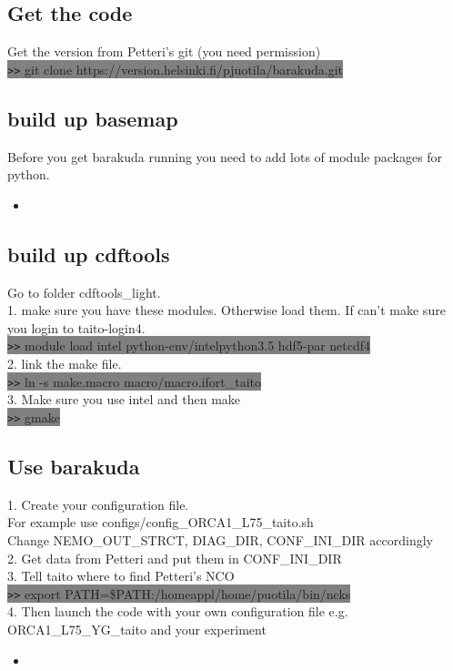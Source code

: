 \documentclass[11pt]{article}
\newcommand{\insertcode}[2]{\begin{itemize}\item[]\end{itemize}} %
\begin{document}
\subsection{Get the code}
Get the version from Petteri's git (you need permission)\\
\colorbox{Grey}{\texttt{>>} git clone https://version.helsinki.fi/pjuotila/barakuda.git}\\
\subsection{build up basemap}
Before you get barakuda running you need to add lots of module packages for python.\\
\insertcode{"../barakuda_script/basemap_install.sh"}{} 
\subsection{build up cdftools}
Go to folder cdftools\_light. \\
1. make sure you have these modules. Otherwise load them. If can't make sure you login to taito-login4.\\
 \colorbox{Grey}{\texttt{>>} module load intel python-env/intelpython3.5 hdf5-par netcdf4}\\
2. link the make file.\\
 \colorbox{Grey}{\texttt{>>} ln -s  make.macro  macro/macro.ifort\_taito}\\
3. Make sure you use intel and then make \\
 \colorbox{Grey}{\texttt{>>} gmake}\\
\subsection{Use barakuda}
1. Create your configuration file.\\
 For example use configs/config\_ORCA1\_L75\_taito.sh \\
 Change NEMO\_OUT\_STRCT, DIAG\_DIR, CONF\_INI\_DIR accordingly \\
2. Get data from Petteri and put them in CONF\_INI\_DIR\\
3. Tell taito where to find Petteri's NCO\\
\colorbox{Grey}{\texttt{>>} export PATH=\$PATH:/homeappl/home/puotila/bin/ncks} \\
4. Then launch the code with your own configuration file e.g. ORCA1\_L75\_YG\_taito and your experiment 
\insertcode{"../barakuda_script/taito_barakuda.sh"}{} 
\end{document}
